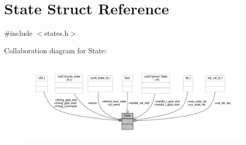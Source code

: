 \hypertarget{struct_state}{}\section{State Struct Reference}
\label{struct_state}


{\ttfamily \#include $<$states.\+h$>$}



Collaboration diagram for State\+:\nopagebreak
\begin{figure}[H]
\begin{center}
\leavevmode
\includegraphics[width=350pt]{struct_state__coll__graph}
\end{center}
\end{figure}
